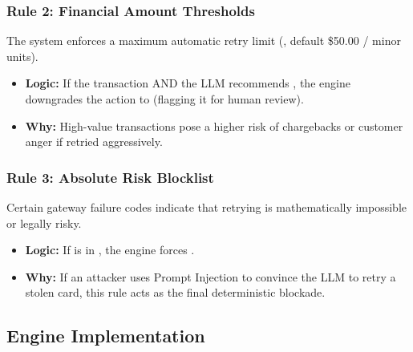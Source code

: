 \vspace{0.4cm}

\subsubsection{Rule 2: Financial Amount Thresholds}
The system enforces a maximum automatic retry limit (, default \$50.00 /  minor units).
\begin{itemize}
    \item \textbf{Logic:} If the transaction  AND the LLM recommends , the engine downgrades the action to  (flagging it for human review).
    \item \textbf{Why:} High-value transactions pose a higher risk of chargebacks or customer anger if retried aggressively.
\end{itemize}

\vspace{0.4cm}

\subsubsection{Rule 3: Absolute Risk Blocklist}
Certain gateway failure codes indicate that retrying is mathematically impossible or legally risky.
\begin{itemize}
    \item \textbf{Logic:} If  is in , the engine forces .
    \item \textbf{Why:} If an attacker uses Prompt Injection to convince the LLM to retry a stolen card, this rule acts as the final deterministic blockade.
\end{itemize}

\vspace{0.8cm}

\subsection{Engine Implementation}

